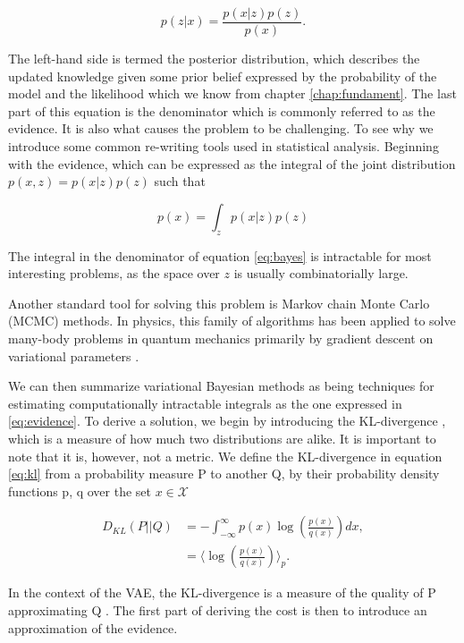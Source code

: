  \begin{equation}\label{eq:bayes}
 p(z| x) = \frac{p(x|z) p(z)}{p(x)}.
 \end{equation}

 \noindent The left-hand side is termed the posterior distribution, which describes the updated knowledge given some prior belief expressed by the probability of the model and the likelihood which we know from chapter \ref{chap:fundament}. The last part of this equation is the denominator which is commonly referred to as the evidence. It is also what causes the problem to be challenging. To see why we introduce some common re-writing tools used in statistical analysis. Beginning with the evidence, which can be expressed as the integral of the joint distribution $p(x, z) = p(x|z)p(z)$ such that

\begin{equation}\label{eq:evidence}
p(x) = \int_z p(x|z)p(z)
\end{equation}

\noindent The integral in the denominator of equation \ref{eq:bayes} is intractable for most interesting problems, as the space over $z$ is usually combinatorially large. 

Another standard tool for solving this problem is Markov chain Monte Carlo (MCMC) methods. In physics, this family of algorithms has been applied to solve many-body problems in quantum mechanics primarily by gradient descent on variational parameters \cite{Hjorth-Jensen}.

We can then summarize variational Bayesian methods as being techniques for estimating computationally intractable integrals as the one expressed in \ref{eq:evidence}. To derive a solution, we begin by introducing the KL-divergence \cite{Kullback1951}, which is a measure of how much two distributions are alike. It is important to note that it is, however, not a metric. We define the KL-divergence in equation \ref{eq:kl} from a probability measure P to another Q, by their probability density functions p, q over the set $x \in \mathcal{X}$

\begin{align}\label{eq:kl}
D_{KL} (P || Q) &= - \int^{\infty}_{-\infty} p(x) \log \left(\frac{p(x)}{q(x)}\right) dx, \\
&= \langle \log \left(\frac{p(x)}{q(x)} \right)\rangle_{p}.
\end{align}

\noindent In the context of the VAE, the KL-divergence is a measure of the quality of P approximating Q \cite{Burnham2002}. The first part of deriving the cost is then to introduce an approximation of the evidence. 

